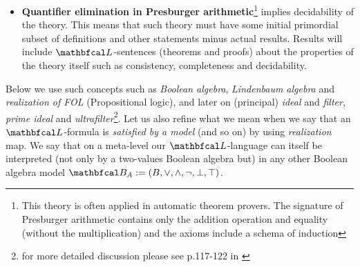 \begin{itemize}
  \item \textbf{Quantifier elimination in Presburger arithmetic}\footnote{This theory is often applied in automatic theorem provers. The signature of Presburger arithmetic contains only the addition operation and equality (without the multiplication) and the axioms include a schema of induction\cite{enwiki:1112785748}} implies decidability of the theory. This means that such theory must have some initial primordial subset of definitions and other statements minus actual results. Results will include $\lsign$-sentences (theorems and proofs) about the properties of the theory itself such as consistency, completeness and decidability.
\end{itemize}

Below we use such concepts such as \textit{Boolean algebra}, \textit{Lindenbaum algebra} and \textit{realization of FOL} (Propositional logic), and later on (principal) \textit{ideal} and \textit{filter}, \textit{prime ideal} and \textit{ultrafilter}\footnote{for more detailed discussion please see p.117-122 in \cite{halbeisen2012}}. Let us also refine what we mean when we say that an $\lsign$-formula is \textit{satisfied by a model} (and so on) by using \textit{realization} map. We say that on a meta-level our $\lsign$-language can itself be interpreted (not only by a two-values Boolean algebra but) in any other Boolean algebra model $\LsB_A := (B, \lor, \land, \neg, \bot, \top)$.


